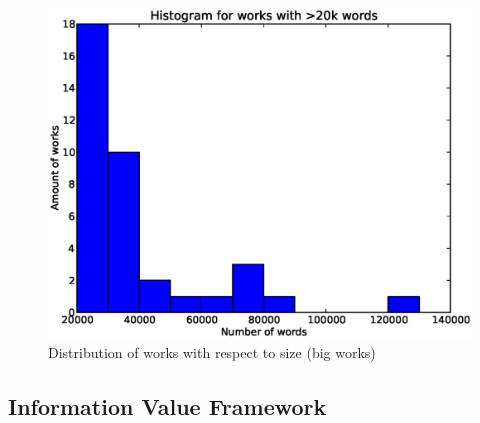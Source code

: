 \documentclass{pnastwo}
\begin{document}
\begin{article}
\begin{figure}
\centerline{\includegraphics[width=.4\textwidth]{figures/hist_tokens_big_works.eps}}
\caption{Distribution of works with respect to size (big works)}\label{afoto}
\end{figure}


\subsection{Information Value Framework}

\medskip
%


\end{article}
\end{document}
